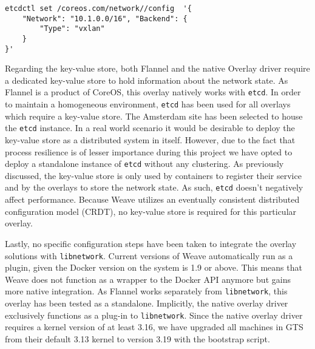 \begin{lstlisting}[caption={Configuring Flannel to use VXLAN instead of UDP tunneling},label=flantun]
etcdctl set /coreos.com/network//config  '{ 
	"Network": "10.1.0.0/16", "Backend": { 
    	"Type": "vxlan"
    } 
}'
\end{lstlisting}

Regarding the key-value store, both Flannel and the native Overlay driver require a dedicated key-value store to hold information about the network state. As Flannel is a product of CoreOS, this overlay natively works with \texttt{etcd}. In order to maintain a homogeneous environment, \texttt{etcd} has been used for all overlays which require a key-value store. The Amsterdam site has been selected to house the \texttt{etcd} instance. In a real world scenario it would be desirable to deploy the key-value store as a distributed system in itself. However, due to the fact that process resilience is of lesser importance during this project we have opted to deploy a standalone instance of \texttt{etcd} without any clustering. As previously discussed, the key-value store is only used by containers to register their service and by the overlays to store the network state. As such, \texttt{etcd} doesn't negatively affect performance. Because Weave utilizes an eventually consistent distributed configuration model (CRDT), no key-value store is required for this particular overlay.

Lastly, no specific configuration steps have been taken to integrate the overlay solutions with \texttt{libnetwork}. Current versions of Weave automatically run as a plugin, given the Docker version on the system is 1.9 or above. This means that Weave does not function as a wrapper to the Docker API anymore but gains more native integration. As Flannel works separately from \texttt{libnetwork}, this overlay has been tested as a standalone. Implicitly, the native overlay driver exclusively functions as a plug-in to \texttt{libnetwork}. Since the native overlay driver requires a kernel version of at least 3.16, we have upgraded all machines in GTS from their default 3.13 kernel to version 3.19 with the bootstrap script. 

